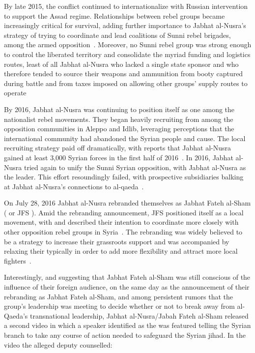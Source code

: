 By late 2015, the conflict continued to internationalize with Russian intervention to support the Assad regime. Relationships between rebel groups became increasingly critical for survival, adding further importance to Jabhat al-Nusra's strategy of trying to coordinate and lead coalitions of Sunni rebel brigades,  among the armed opposition~\autocite[33]{lister2016profiling}. Moreover, no Sunni rebel group was strong enough to control the liberated territory and consolidate the myriad funding and logistics routes, least of all Jabhat al-Nusra who lacked a single state sponsor and who therefore tended to source their weapons and ammunition from booty captured during battle and from taxes imposed on allowing other groups' supply routes to operate~\autocite[32]{lister2016profiling}

 By 2016, Jabhat al-Nusra was continuing to position itself as one among the nationalist rebel movements. They began heavily recruiting from among the opposition communities in Aleppo and Idlib, leveraging perceptions that the international community had abandoned the Syrian people and cause. The local recruiting strategy paid off dramatically, with reports that Jabhat al-Nusra gained at least 3,000 Syrian forces in the first half of 2016~\autocite[6]{lister2016profiling}. In 2016, Jabhat al-Nusra tried again to unify the Sunni Syrian opposition, with Jabhat al-Nusra as the leader. This effort resoundingly failed, with prospective subsidiaries balking at Jabhat al-Nusra's connections to al-qaeda~\autocite{lister2018loss}.

On July 28, 2016 Jabhat al-Nusra rebranded themselves as Jabhat Fateh al-Sham ( or JFS ). Amid the rebranding announcement, JFS positioned itself as a local movement, with  and described their intention to coordinate more closely with other opposition rebel groups in Syria~\autocite{jabhatfs2016announce, jabhatfs2016break}. The rebranding was widely believed to be a strategy to increase their grassroots support and was accompanied by relaxing their typically   in order to add more flexibility and attract more local fighters~\autocite{haid2017behind}.

Interestingly, and suggesting that Jabhat Fateh al-Sham was still conscious of the influence of their foreign audience, on the same day as the announcement of their rebranding as Jabhat Fateh al-Sham, and among persistent rumors that the group's leadership was meeting to decide whether or not to break away from al-Qaeda's transnational leadership, Jabhat al-Nusra/Jabah Fateh al-Sham released a second video in which a speaker identified as the  was featured telling the Syrian branch to take any course of action needed to safeguard the Syrian jihad. In the video the alleged deputy counselled:

